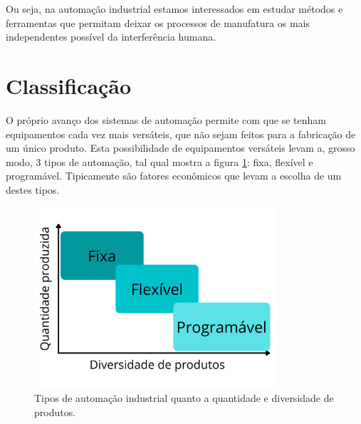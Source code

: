 Ou seja, na automação industrial estamos interessados em estudar métodos e ferramentas que permitam deixar os processos de manufatura os mais independentes possível da interferência humana. 

\section{Classificação}

O próprio avanço dos sistemas de automação permite com que se tenham equipamentos cada vez mais versáteis, que não sejam feitos para a fabricação de um único produto. Esta possibilidade de equipamentos versáteis levam a, grosso modo, 3 tipos de automação, tal qual mostra a figura \ref{fig:tipos_automacao}: fixa, flexível e programável. Tipicamente são fatores econômicos que levam a escolha de um destes tipos.

\begin{figure}[hbt]
	\begin{center}
    \includegraphics[width=0.8\textwidth  ]{figuras/fixaflexprog}
	\end{center}
	\caption{Tipos de automação industrial quanto a quantidade e diversidade de produtos.}
	\label{fig:tipos_automacao}
\end{figure}

